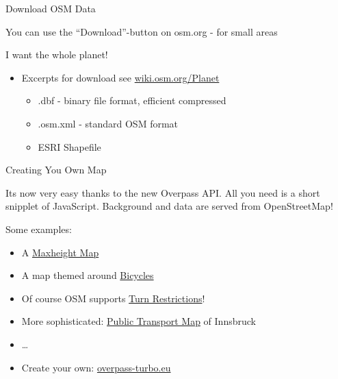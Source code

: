 \documentclass{beamer}
\begin{document}
\begin{frame}{Download OSM Data}

You can use the ``Download''-button on osm.org - for small areas

\pause
I want the whole planet!

\begin{itemize}
  \item Excerpts for download see \href{http://wiki.osm.org/Planet}{wiki.osm.org/Planet}
  \begin{itemize}
    \item .dbf - binary file format, efficient compressed
    \item .osm.xml - standard OSM format
    \item ESRI Shapefile
  \end{itemize}
\end{itemize}
\end{frame}


\begin{frame}{Creating You Own Map}

  Its now very easy thanks to the new Overpass API. All you need is a short snipplet of JavaScript. Background and data are served from OpenStreetMap!

  Some examples:

  \begin{itemize}
    \item A \href{http://maxheight.bplaced.net/overpass/prototyp.html?zoom=14&lat=50.7322&lon=7.09816&layers=B0000000TFFFFFFFFFFFTTT&label=T&opacity=70}{Maxheight Map} 
    \item A map themed around \href{http://mijndev.openstreetmap.nl/~ligfietser/fiets/?map=cycleways&zoom=15&lat=47.07201&lon=15.43873&layers=B00000FFFFFFTTFTFTFFFFF}{Bicycles}
    \item Of course OSM supports \href{http://map.comlu.com/}{Turn Restrictions}!
    \item More sophisticated: \href{http://simon04.github.com/POImap/ivb.html}{Public Transport Map} of Innsbruck
    \item \dots
    \item Create your own: \href{http://overpass-turbo.eu/?q=PCEtLQpUaGlzIMSHIGFuIGV4YW1wbGUgT3ZlcnBhc8SIcXXEmXkuxIRyecSJdCBvdcSoYsSmcHJlxJ1pbmcgdGjElVJ1xI1ixKt0b8SNYWJvxJghClnEqiBjxIwgZsSzZCBtb8SwxI7EkMSSxJTEiHdpxLfEtsS4IExvYcWQxL9vbMSjxII-CjzEn8ShxLZ5cGU9Im5vZGUixakgIDxoxJwta3Yga8WyxJFlbsWbeSIgdsWyZHLEs2vEs2dfd2F0xJkiL8W5xbtixYN4LcWsxKUge3vGnW94fX3GmsSAxILEt8SKxIphxKtvLWNvxZdlxpfFkMWaxZzEt2UKxbrHgMeBx4LHgmN1csSwbsSobWFwxotpZXfFim\_Fk2TEs8aWxLEuxajFqi\_GoXnFqTzEr8SzdMaa&c=BOxHDJTqUR&R}{overpass-turbo.eu}
  \end{itemize}

  
\end{frame}
\end{document}
